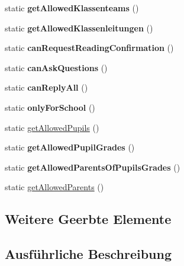 \begin{DoxyCompactItemize}
static {\bfseries get\+Allowed\+Klassenteams} ()
\item 
\mbox{\label{class_message_send_rights_ade480a2b9ae177b649eaa2fa89a21bf7}} 
static {\bfseries get\+Allowed\+Klassenleitungen} ()
\item 
\mbox{\label{class_message_send_rights_a1dcf4b5fcd45ce90d1dc5b3b15f4777f}} 
static {\bfseries can\+Request\+Reading\+Confirmation} ()
\item 
\mbox{\label{class_message_send_rights_aea6f76c10858720ef917a6afa3a54c5a}} 
static {\bfseries can\+Ask\+Questions} ()
\item 
\mbox{\label{class_message_send_rights_ad926146cf4ba97877eb442790cf03e05}} 
static {\bfseries can\+Reply\+All} ()
\item 
\mbox{\label{class_message_send_rights_a2c4bb80f5657aeefaaf711649e01ae9d}} 
static {\bfseries only\+For\+School} ()
\item 
static \mbox{\hyperlink{class_message_send_rights_a5ea885d113c520d24864d8b869db278d}{get\+Allowed\+Pupils}} ()
\item 
\mbox{\label{class_message_send_rights_a419a84086cf1bf0a330dcda9105d5740}} 
static {\bfseries get\+Allowed\+Pupil\+Grades} ()
\item 
\mbox{\label{class_message_send_rights_aafef3208f41d1b96a34f09832b3986eb}} 
static {\bfseries get\+Allowed\+Parents\+Of\+Pupils\+Grades} ()
\item 
static \mbox{\hyperlink{class_message_send_rights_adbdb45e1e8c669862de329214902fa2d}{get\+Allowed\+Parents}} ()
\end{DoxyCompactItemize}
\subsection*{Weitere Geerbte Elemente}


\subsection{Ausführliche Beschreibung}


